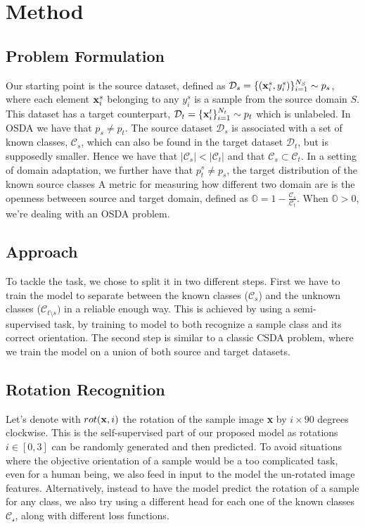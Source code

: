\documentclass[10pt,twocolumn,letterpaper]{article}
\begin{document}
\section{Method}
\label{sec:method}

\subsection{Problem Formulation}
\label{sec:problemformulation}
Our starting point is the source dataset, defined as $\mathcal{D}_s = \{({\bf x}_i^s, y_i^s)\}_{i=1}^{N_S} \sim p_s$, where each element ${\bf x}_i^s$ belonging to any $y_i^s$ is a sample from the source domain $S$.
This dataset has a target counterpart, $\mathcal{D}_t = \{{\bf x}_i^t\}_{i=1}^{N_t} \sim p_t$ which is unlabeled.
In OSDA we have that $p_s \neq p_t$.
The source dataset $\mathcal{D}_s$ is associated with a set of known classes, $\mathcal{C}_s$, which can also be found in the target dataset $\mathcal{D}_t$, but is supposedly smaller.
Hence we have that $|\mathcal{C}_s| < |\mathcal{C}_t|$ and that $\mathcal{C}_s \subset \mathcal{C}_t$.
In a setting of domain adaptation, we further have that $p_t^s \neq p_s$, the target distribution of the known source classes
A metric for measuring how different two domain are is the openness betweeen source and target domain\cite{bendale2015open}, defined as $\displaystyle \mathbb{O} = 1-\frac{\mathcal{C}_s}{\mathcal{C}_t}$.
When $\mathbb{O} > 0$, we're dealing with an OSDA problem.

\subsection{Approach}
\label{sec:apporach}
To tackle the task, we chose to split it in two different steps.
First we have to train the model to separate between the known classes ($\mathcal{C}_s$) and the unknown classes ($\mathcal{C}_{t\setminus s})$ in a reliable enough way.
This is achieved by using a semi-supervised task, by training to model to both recognize a sample class and its correct orientation.
The second step is similar to a classic CSDA problem, where we train the model on a union of both source and target datasets.

\subsection{Rotation Recognition}

Let's denote with $rot({\bf x}, i)$ the rotation of the sample image {\bf x} by $i\times 90$ degrees clockwise.
This is the self-supervised part of our proposed model as rotations $i \in [0, 3]$ can be randomly generated and then predicted.
To avoid situations where the objective orientation of a sample would be a too complicated task, even for a human being, we also feed in input to the model the un-rotated image features.
Alternatively, instead to have the model predict the rotation of a sample for any class, we also try using a different head for each one of the known classes $\mathcal{C_s}$, along with different loss functions.
\end{document}
